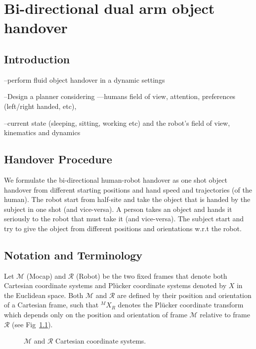 \chapter{Bi-directional dual arm object handover\newline}

\newpage
\section{Introduction}
--perform fluid object handover in a dynamic settings

--Design a planner considering —humans field of view, attention, preferences (left/right handed, etc),

--current state (sleeping, sitting, working etc) and the robot’s field of view, kinematics and dynamics

\newpage
\section{Handover Procedure}
We formulate the bi-directional human-robot handover as one shot object handover from different starting positions and hand speed and trajectories (of the human). The robot start from half-site and take the object that is handed by the subject in one shot (and vice-versa). A person takes an object and hands it seriously to the robot that must take it (and vice-versa). The subject start and try to give the object from different positions and orientations w.r.t the robot.


\newpage
\section{Notation and Terminology}

Let $\mathcal{M}$ (Mocap) and $\mathcal{R}$ (Robot) be the two fixed frames that denote both Cartesian coordinate systems and Pl\"ucker coordinate systems denoted by $X$ in the Euclidean space. Both $\mathcal{M}$ and $\mathcal{R}$ are defined by their position and orientation of a Cartesian frame, such that ${}^MX_R$ denotes the Pl\"ucker coordinate transform which depends only on the position and orientation of frame $\mathcal{M}$ relative to frame $\mathcal{R}$\cite{featherstone2014rigid} (see Fig~\ref{fig:frames}).


\begin{figure}[h]
	\caption{$\mathcal{M}$ and $\mathcal{R}$ Cartesian coordinate systems.}
	\label{fig:frames}
\end{figure}



